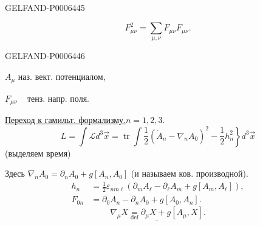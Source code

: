 \begin{GelfandAdjacentEvidence}{GELFAND-P000644}{5}

\[
F_{\mu\nu}^2=\sum_{\mu,\nu}F_{\mu\nu}F_{\mu\nu}.
\]
\end{GelfandAdjacentEvidence}
\begin{GelfandAdjacentEvidence}{GELFAND-P000644}{6}


\(A_\mu\) наз. вект. потенциалом,

\(F_{\mu\nu}\) \textemdash\,\textquotedbl\,\textemdash\ тенз. напр. поля.

\underline{Переход к гамильт. формализму.}\quad \(n=1,2,3\).
\[
L=\int\mathcal Ld^3\vec x=\operatorname{tr}\int
\left.\frac12(\dot A_n-\nabla_n A_0)^2-\frac12h_n^2\right\}d^3\vec x
\]
(выделяем время)
\end{GelfandAdjacentEvidence}


Здесь \(\nabla_n A_0=\partial_n A_0+g[A_n,A_0]\)
(и называем ков. производной).
\[
\begin{aligned}
h_n&=\frac12\varepsilon_{nm\ell}(\partial_m A_\ell-\partial_\ell A_m+g[A_m,A_\ell]),\\
F_{0n}&=\partial_0 A_n-\partial_n A_0+g[A_0,A_n].
\end{aligned}
\]
\[
\underline{\nabla_\mu X\underset{\mathrm{def}}{=}\partial_\mu X+g[A_\mu,X]}.
\]


